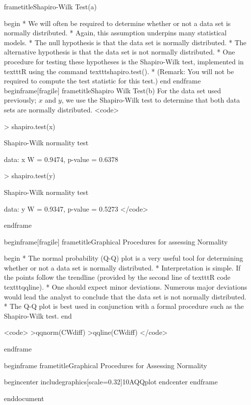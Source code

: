 
frametitle{Shapiro-Wilk Test(a)}


begin{ }
         * We will often be required to determine whether or not a data set is normally distributed.
         * Again, this assumption underpins many statistical models.
         * The null hypothesis is that the data set is normally distributed.
         * The alternative hypothesis is that the data set is not normally distributed.
         * One procedure for testing these hypotheses is the Shapiro-Wilk test, implemented in texttt{R} using the command texttt{shapiro.test()}.
         * (Remark: You will not be required to compute the test statistic for this test.)
end{ }
end{frame}
begin{frame}[fragile]
frametitle{Shapiro Wilk Test(b)}
For the data set used previously; $x$ and $y$, we use the Shapiro-Wilk test to determine that both data sets are normally distributed.
<code>

> shapiro.test(x)

        Shapiro-Wilk normality test

data:  x
W = 0.9474, p-value = 0.6378

> shapiro.test(y)

        Shapiro-Wilk normality test

data:  y
W = 0.9347, p-value = 0.5273
</code>

end{frame}


begin{frame}[fragile]
frametitle{Graphical Procedures for assessing Normality}

begin{ }
         * The normal probability (Q-Q) plot is a very useful tool for determining whether or not a data set is normally distributed.
         * Interpretation is simple. If the points follow the trendline (provided by the second line of texttt{R} code texttt{qqline}).
         * One should expect minor deviations. Numerous major deviations would lead the analyst to conclude that the data set is not normally distributed.
         * The Q-Q plot is best used in conjunction with a formal procedure such as the Shapiro-Wilk test.
end{ }

<code>
>qqnorm(CWdiff)
>qqline(CWdiff)
</code>

end{frame}


begin{frame}
frametitle{Graphical Procedures for Assessing Normality}

begin{center}
includegraphics[scale=0.32]{10AQQplot}
end{center}
end{frame}

end{document}

